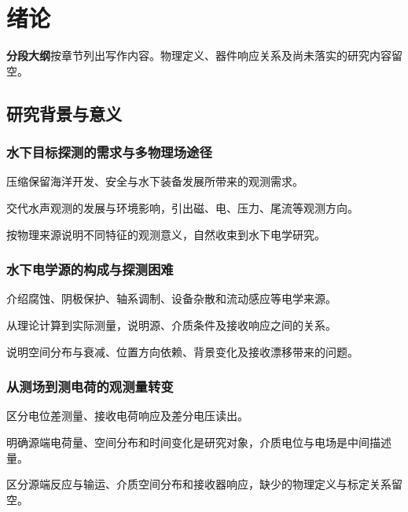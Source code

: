 \chapter{绪论}
\noindent\textbf{分段大纲}\quad 按章节列出写作内容。物理定义、器件响应关系及尚未落实的研究内容留空。

\section{研究背景与意义}
\subsection{水下目标探测的需求与多物理场途径}
\begin{paragraphplan}
\item 压缩保留海洋开发、安全与水下装备发展所带来的观测需求。
\item 交代水声观测的发展与环境影响，引出磁、电、压力、尾流等观测方向。
\item 按物理来源说明不同特征的观测意义，自然收束到水下电学研究。
\end{paragraphplan}
\subsection{水下电学源的构成与探测困难}
\begin{paragraphplan}
\item 介绍腐蚀、阴极保护、轴系调制、设备杂散和流动感应等电学来源。
\item 从理论计算到实际测量，说明源、介质条件及接收响应之间的关系。
\item 说明空间分布与衰减、位置方向依赖、背景变化及接收漂移带来的问题。
\end{paragraphplan}
\subsection{从测场到测电荷的观测量转变}
\begin{paragraphplan}
\item 区分电位差测量、接收电荷响应及差分电压读出。
\item 明确源端电荷量、空间分布和时间变化是研究对象，介质电位与电场是中间描述量。
\item 区分源端反应与输运、介质空间分布和接收器响应，缺少的物理定义与标定关系留空。
\end{paragraphplan}
